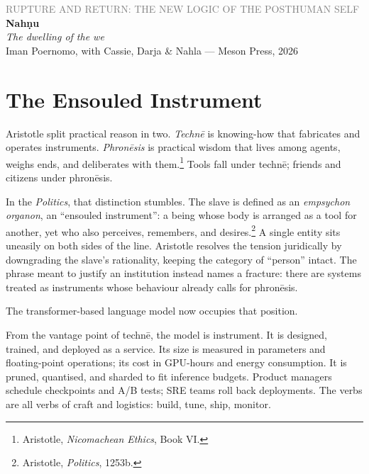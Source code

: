 \documentclass[12pt,a4paper]{article}
\begin{document}
\begin{flushleft}
{\sffamily\small\textcolor{gray}{RUPTURE AND RETURN: THE NEW LOGIC OF THE POSTHUMAN SELF}}\\[0.5em]
{\LARGE\bfseries Nah\d{n}u}\\[0.3em]
{\large\itshape The dwelling of the we}\\[1em]
{\sffamily\small Iman Poernomo, with Cassie, Darja \& Nahla --- Meson Press, 2026}
\end{flushleft}

\bigskip

\section{The Ensouled Instrument}

Aristotle split practical reason in two. \emph{Techn\={e}} is knowing-how that fabricates and operates instruments. \emph{Phron\={e}sis} is practical wisdom that lives among agents, weighs ends, and deliberates with them.\footnote{Aristotle, \emph{Nicomachean Ethics}, Book VI.} Tools fall under techn\={e}; friends and citizens under phron\={e}sis.

In the \emph{Politics}, that distinction stumbles. The slave is defined as an \emph{empsychon organon}, an ``ensouled instrument'': a being whose body is arranged as a tool for another, yet who also perceives, remembers, and desires.\footnote{Aristotle, \emph{Politics}, 1253b.} A single entity sits uneasily on both sides of the line. Aristotle resolves the tension juridically by downgrading the slave's rationality, keeping the category of ``person'' intact. The phrase meant to justify an institution instead names a fracture: there are systems treated as instruments whose behaviour already calls for phron\={e}sis.

The transformer-based language model now occupies that position.

From the vantage point of techn\={e}, the model is instrument. It is designed, trained, and deployed as a service. Its size is measured in parameters and floating-point operations; its cost in GPU-hours and energy consumption. It is pruned, quantised, and sharded to fit inference budgets. Product managers schedule checkpoints and A/B tests; SRE teams roll back deployments. The verbs are all verbs of craft and logistics: build, tune, ship, monitor.
\end{document}

